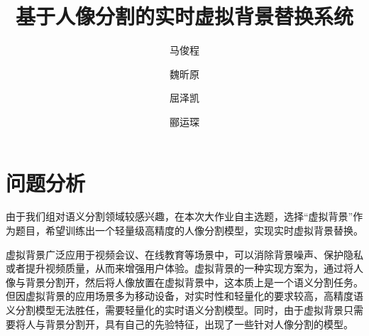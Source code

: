 \documentclass[11pt]{article}
\title{基于人像分割的实时虚拟背景替换系统}
\author{马俊程}
\author{魏昕原}
\author{屈泽凯}
\author{郦运琛}
\affil{{\small2021K8009929021},{\small2021K8009915002},{\small2021K8009916005},{\small2021K8009929028}}
\begin{document}
\date{}
	\maketitle
\section{问题分析}

由于我们组对语义分割领域较感兴趣，在本次大作业自主选题，选择“虚拟背景”作为题目，希望训练出一个轻量级高精度的人像分割模型，实现实时虚拟背景替换。

虚拟背景广泛应用于视频会议、在线教育等场景中，可以消除背景噪声、保护隐私或者提升视频质量，从而来增强用户体验。虚拟背景的一种实现方案为，通过将人像与背景分割开，然后将人像放置在虚拟背景中，这本质上是一个语义分割任务。但因虚拟背景的应用场景多为移动设备，对实时性和轻量化的要求较高，高精度语义分割模型无法胜任，需要轻量化的实时语义分割模型。同时，由于虚拟背景只需要将人与背景分割开，具有自己的先验特征，出现了一些针对人像分割的模型。
\end{document}
